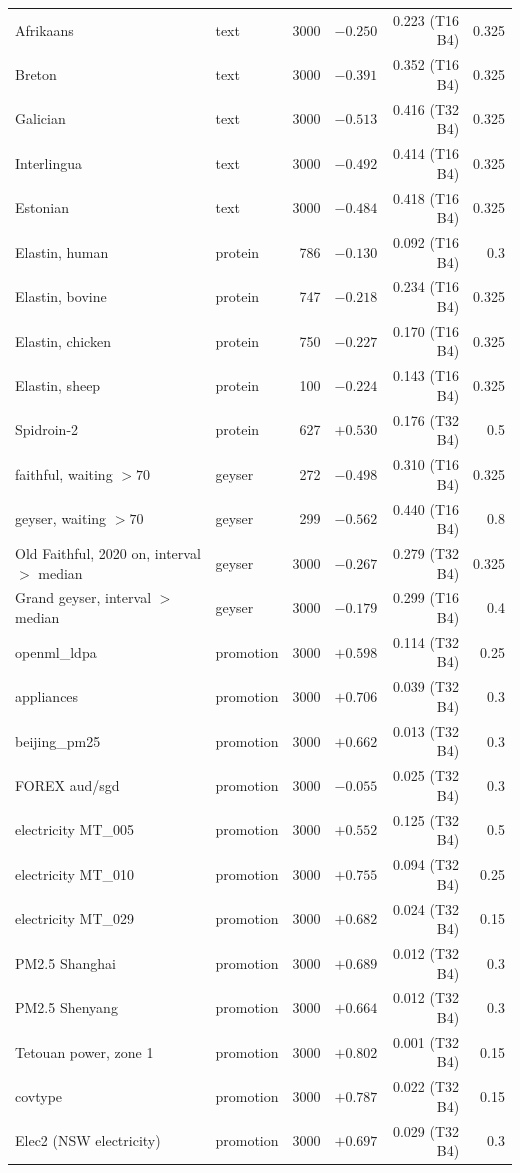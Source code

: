 \documentclass{article}
\theoremstyle{plain}
\theoremstyle{definition}
\theoremstyle{remark}
\begin{document}
\begin{longtable}{llrrrr}
Afrikaans & text & 3000 & $-0.250$ & 0.223 (T16 B4) & 0.325\\
Breton & text & 3000 & $-0.391$ & 0.352 (T16 B4) & 0.325\\
Galician & text & 3000 & $-0.513$ & 0.416 (T32 B4) & 0.325\\
Interlingua & text & 3000 & $-0.492$ & 0.414 (T16 B4) & 0.325\\
Estonian & text & 3000 & $-0.484$ & 0.418 (T16 B4) & 0.325\\
\midrule
Elastin, human & protein & 786 & $-0.130$ & 0.092 (T16 B4) & 0.3\\
Elastin, bovine & protein & 747 & $-0.218$ & 0.234 (T16 B4) & 0.325\\
Elastin, chicken & protein & 750 & $-0.227$ & 0.170 (T16 B4) & 0.325\\
Elastin, sheep & protein & 100 & $-0.224$ & 0.143 (T16 B4) & 0.325\\
Spidroin-2 & protein & 627 & $+0.530$ & 0.176 (T32 B4) & 0.5\\
\midrule
faithful, waiting $>70$ & geyser & 272 & $-0.498$ & 0.310 (T16 B4) & 0.325\\
geyser, waiting $>70$ & geyser & 299 & $-0.562$ & 0.440 (T16 B4) & 0.8\\
Old Faithful, 2020 on, interval $>$ median & geyser & 3000 & $-0.267$ & 0.279 (T32 B4) & 0.325\\
Grand geyser, interval $>$ median & geyser & 3000 & $-0.179$ & 0.299 (T16 B4) & 0.4\\
\midrule
openml\_ldpa & promotion & 3000 & $+0.598$ & 0.114 (T32 B4) & 0.25\\
appliances & promotion & 3000 & $+0.706$ & 0.039 (T32 B4) & 0.3\\
beijing\_pm25 & promotion & 3000 & $+0.662$ & 0.013 (T32 B4) & 0.3\\
FOREX aud/sgd & promotion & 3000 & $-0.055$ & 0.025 (T32 B4) & 0.3\\
electricity MT\_005 & promotion & 3000 & $+0.552$ & 0.125 (T32 B4) & 0.5\\
electricity MT\_010 & promotion & 3000 & $+0.755$ & 0.094 (T32 B4) & 0.25\\
electricity MT\_029 & promotion & 3000 & $+0.682$ & 0.024 (T32 B4) & 0.15\\
PM2.5 Shanghai & promotion & 3000 & $+0.689$ & 0.012 (T32 B4) & 0.3\\
PM2.5 Shenyang & promotion & 3000 & $+0.664$ & 0.012 (T32 B4) & 0.3\\
Tetouan power, zone 1 & promotion & 3000 & $+0.802$ & 0.001 (T32 B4) & 0.15\\
covtype & promotion & 3000 & $+0.787$ & 0.022 (T32 B4) & 0.15\\
Elec2 (NSW electricity) & promotion & 3000 & $+0.697$ & 0.029 (T32 B4) & 0.3\\
\bottomrule
\end{longtable}


\end{document}

